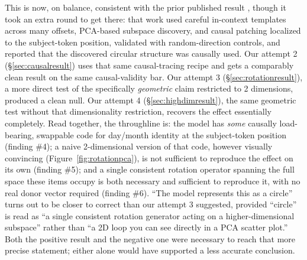 \documentclass[11pt]{article}
\begin{document}
This is now, on balance, consistent with the prior published result
\cite{engels2024not}, though it took an extra round to get there: that work
used careful in-context templates across many offsets, PCA-based subspace
discovery, and causal patching localized to the subject-token position,
validated with random-direction controls, and reported that the discovered
circular structure was causally used. Our attempt 2 (\S\ref{sec:causalresult})
uses that same causal-tracing recipe and gets a comparably clean result on
the same causal-validity bar. Our attempt 3 (\S\ref{sec:rotationresult}), a
more direct test of the specifically \emph{geometric} claim restricted to 2
dimensions, produced a clean null. Our attempt 4
(\S\ref{sec:highdimresult}), the same geometric test without that
dimensionality restriction, recovers the effect essentially completely. Read
together, the throughline is: the model has \emph{some} causally
load-bearing, swappable code for day/month identity at the subject-token
position (finding \#4); a naive 2-dimensional version of that code, however
visually convincing (Figure~\ref{fig:rotationpca}), is not sufficient to
reproduce the effect on its own (finding \#5); and a single consistent
rotation operator spanning the full space these items occupy is both
necessary and sufficient to reproduce it, with no real donor vector required
(finding \#6). ``The model represents this as a circle'' turns out to be
closer to correct than our attempt 3 suggested, provided ``circle'' is read
as ``a single consistent rotation generator acting on a higher-dimensional
subspace'' rather than ``a 2D loop you can see directly in a PCA scatter
plot.'' Both the positive result and the negative one were necessary to
reach that more precise statement; either alone would have supported a
less accurate conclusion.
\end{document}
